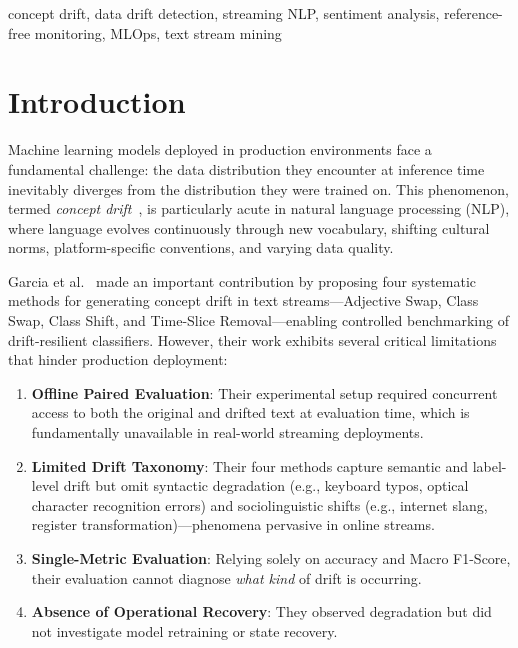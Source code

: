 \documentclass[conference]{IEEEtran}
\begin{document}
\begin{IEEEkeywords}
concept drift, data drift detection, streaming NLP, sentiment analysis, reference-free monitoring, MLOps, text stream mining
\end{IEEEkeywords}

\section{Introduction}

Machine learning models deployed in production environments face a fundamental challenge: the data distribution they encounter at inference time inevitably diverges from the distribution they were trained on. This phenomenon, termed \textit{concept drift}~\cite{gama2014survey}, is particularly acute in natural language processing (NLP), where language evolves continuously through new vocabulary, shifting cultural norms, platform-specific conventions, and varying data quality.

Garcia et al.~\cite{garcia2024methods} made an important contribution by proposing four systematic methods for generating concept drift in text streams---Adjective Swap, Class Swap, Class Shift, and Time-Slice Removal---enabling controlled benchmarking of drift-resilient classifiers. However, their work exhibits several critical limitations that hinder production deployment:
\begin{enumerate}
    \item \textbf{Offline Paired Evaluation}: Their experimental setup required concurrent access to both the original and drifted text at evaluation time, which is fundamentally unavailable in real-world streaming deployments.
    \item \textbf{Limited Drift Taxonomy}: Their four methods capture semantic and label-level drift but omit syntactic degradation (e.g., keyboard typos, optical character recognition errors) and sociolinguistic shifts (e.g., internet slang, register transformation)---phenomena pervasive in online streams.
    \item \textbf{Single-Metric Evaluation}: Relying solely on accuracy and Macro F1-Score, their evaluation cannot diagnose \textit{what kind} of drift is occurring.
    \item \textbf{Absence of Operational Recovery}: They observed degradation but did not investigate model retraining or state recovery.
\end{enumerate}
\end{document}
